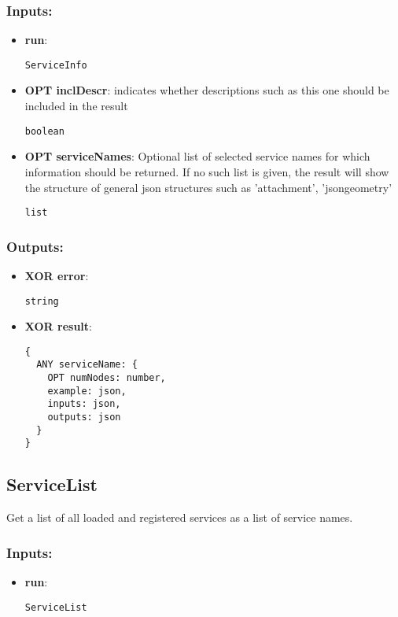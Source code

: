 \subsubsection*{Inputs:}
\begin{itemize}
  \small
    \item \textbf{run}: 
\begin{lstlisting}
ServiceInfo
\end{lstlisting}
    \item \textbf{OPT inclDescr}: indicates whether descriptions such as this one should be included in the result
\begin{lstlisting}
boolean
\end{lstlisting}
    \item \textbf{OPT serviceNames}: Optional list of selected service names for which information should  be returned. If no such list is given, the result will show the  structure of general json structures such as 'attachment',  'jsongeometry'
\begin{lstlisting}
list
\end{lstlisting}
  \end{itemize}
\subsubsection*{Outputs:}
\begin{itemize}
  \small
    \item \textbf{XOR error}: 
\begin{lstlisting}
string
\end{lstlisting}
    \item \textbf{XOR result}: 
\begin{lstlisting}
{
  ANY serviceName: {
    OPT numNodes: number, 
    example: json, 
    inputs: json, 
    outputs: json
  }
}
\end{lstlisting}
  \end{itemize}

\subsection{ServiceList}
\label{ch:builtinservices:ServiceList}
Get a list of all loaded and registered services as a list of service names.
\subsubsection*{Inputs:}
\begin{itemize}
  \small
    \item \textbf{run}: 
\begin{lstlisting}
ServiceList
\end{lstlisting}
  \end{itemize}
